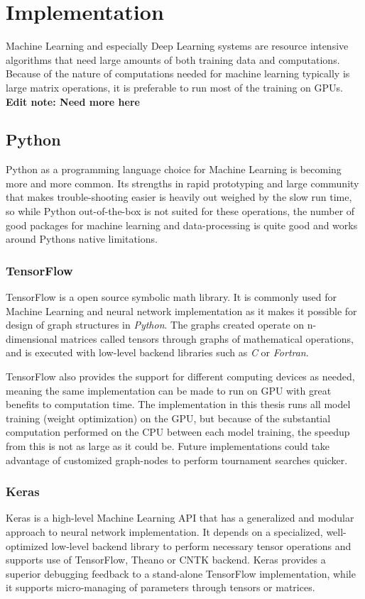 \chapter{Implementation}
Machine Learning and especially Deep Learning systems are resource intensive algorithms that need large amounts of both training data and computations. Because of the nature of computations needed for machine learning typically is large matrix operations, it is preferable to run most of the training on GPUs.
\textbf{Edit note: Need more here}

\section{Python}
Python as a programming language choice for Machine Learning is becoming more and more common. Its strengths in rapid prototyping and large community that makes trouble-shooting easier is heavily out weighed by the slow run time, so while Python out-of-the-box is not suited for these operations, the number of good packages for machine learning and data-processing is quite good and works around Pythons native limitations. 

\subsection{TensorFlow}
TensorFlow\cite{tensorflow} is a open source symbolic math library. It is commonly used for Machine Learning and neural network implementation as it makes it possible for design of graph structures in \textit{Python}. The graphs created operate on n-dimensional matrices called tensors through graphs of mathematical operations, and is executed with low-level backend libraries such as \textit{C} or \textit{Fortran}.

TensorFlow also provides the support for different computing devices as needed, meaning the same implementation can be made to run on GPU with great benefits to computation time. The implementation in this thesis runs all model training (weight optimization) on the GPU, but because of the substantial computation performed on the CPU between each model training, the speedup from this is not as large as it could be. Future implementations could take advantage of customized graph-nodes to perform tournament searches quicker. 

\subsection{Keras}
Keras\cite{keras} is a high-level Machine Learning API that has a generalized and modular approach to neural network implementation. It depends on a specialized, well-optimized low-level backend library to perform necessary tensor operations and supports use of TensorFlow, Theano or CNTK backend. Keras provides a superior debugging feedback to a stand-alone TensorFlow implementation, while it supports micro-managing of parameters through tensors or matrices.


